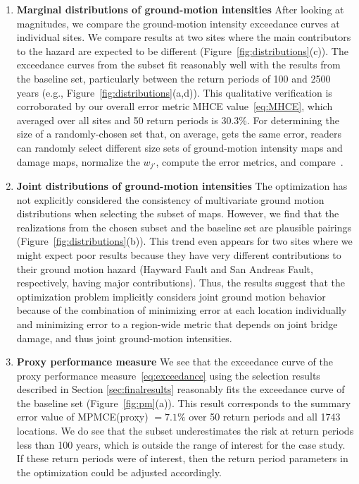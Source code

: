 \begin{enumerate}
\item \textbf{Marginal distributions of ground-motion intensities} After looking at magnitudes, we compare the ground-motion intensity exceedance curves at individual sites. We compare results at two sites where the main contributors to the hazard are expected to be different  (Figure~\ref{fig:distributions}{\color{red}(c)}). The exceedance curves from the subset  fit reasonably well with the results from the baseline set, particularly between the return periods of 100 and 2500 years (e.g., Figure~\ref{fig:distributions}{\color{red}(a,d)}). This qualitative verification is corroborated by our overall error metric MHCE value~\eqref{eq:MHCE}, which averaged over all sites and 50 return periods is 30.3\%. For determining the size of a randomly-chosen set that, on average, gets the same error, readers can randomly select different size sets of ground-motion intensity maps and damage maps, normalize the $w_{j'}$, compute the error metrics, and compare~\cite{gearhart_optimization-based_2014}.
\item\textbf{Joint distributions of ground-motion intensities} 
The optimization has not explicitly considered the consistency of multivariate ground motion distributions when selecting the subset of maps.
However, we find that the realizations from the chosen subset and the baseline set are plausible pairings (Figure~\ref{fig:distributions}{\color{red}(b)}).
This trend even appears for two sites where we might expect poor results because they have very different contributions to their ground motion hazard (Hayward Fault and San Andreas Fault, respectively, having major contributions). Thus, the results suggest that the optimization problem implicitly considers joint ground motion behavior because of the combination of minimizing error at each location individually and minimizing error to a region-wide metric that depends on joint bridge damage, and thus joint ground-motion intensities.
\item \textbf{Proxy performance measure} We see that the exceedance curve of the proxy performance measure~\eqref{eq:exceedance} using the selection results described in Section \ref{sec:finalresults} reasonably fits the exceedance curve of the baseline set (Figure~\ref{fig:pm}{\color{red}(a)}). This result corresponds to the summary error value of MPMCE(proxy) $= 7.1\%$ over 50 return periods and all 1743 locations. We do see that the subset underestimates the risk at return periods less than 100 years, which is outside the range of interest for the case study. If these return periods were of interest, then the return period parameters in the optimization could be adjusted accordingly.
\end{enumerate}
